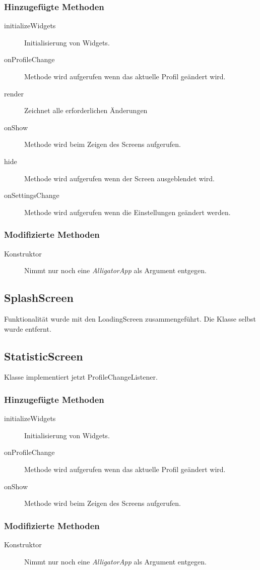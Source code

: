 \subsubsection{Hinzugefügte Methoden}
\begin{description}
\item[initializeWidgets]
Initialisierung von Widgets.
\item[onProfileChange]
Methode wird aufgerufen wenn das aktuelle Profil geändert wird.

\item[render]
Zeichnet alle erforderlichen Änderungen
\item[onShow]
Methode wird beim Zeigen des Screens aufgerufen.
\item[hide]
Methode wird aufgerufen wenn der Screen ausgeblendet wird.
\item[onSettingsChange]
Methode wird aufgerufen wenn die Einstellungen geändert werden.


\end{description}

\subsubsection{Modifizierte Methoden}
\begin{description}
\item[Konstruktor]
Nimmt nur noch eine \emph{AlligatorApp} als Argument entgegen.

\end{description}

\subsection{SplashScreen}
Funktionalität wurde mit den LoadingScreen zusammengeführt. Die Klasse selbst wurde entfernt.



\subsection{StatisticScreen}
Klasse implementiert jetzt ProfileChangeListener.
\subsubsection{Hinzugefügte Methoden}
\begin{description}
\item[initializeWidgets]
Initialisierung von Widgets.
\item[onProfileChange]
Methode wird aufgerufen wenn das aktuelle Profil geändert wird.

\item[onShow]
Methode wird beim Zeigen des Screens aufgerufen.



\end{description}

\subsubsection{Modifizierte Methoden}
\begin{description}
\item[Konstruktor]
Nimmt nur noch eine \emph{AlligatorApp} als Argument entgegen.

\end{description}

